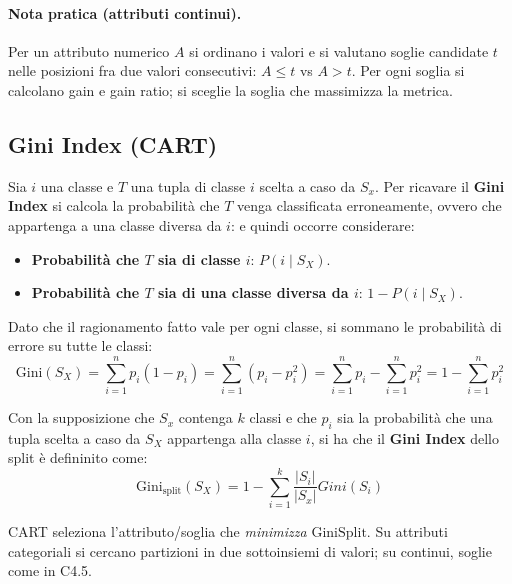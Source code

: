 \paragraph{Nota pratica (attributi continui).}
Per un attributo numerico $A$ si ordinano i valori e si valutano soglie candidate $t$ nelle posizioni fra due valori consecutivi: $A\le t$ vs $A>t$. Per ogni soglia si calcolano gain e gain ratio; si sceglie la soglia che massimizza la metrica.


\subsection{Gini Index (CART)}\label{subsec:gini}
Sia $i$ una classe e $T$ una tupla di classe $i$ scelta a caso da $S_x$. Per ricavare il \textbf{Gini Index} si calcola la probabilità che $T$ venga classificata erroneamente, ovvero che appartenga a una classe diversa da $i$: e quindi occorre considerare:
\begin{itemize}
  \item \textbf{Probabilità che $T$ sia di classe $i$}: $P(i\mid S_X)$.
  \item \textbf{Probabilità che $T$ sia di una classe diversa da $i$}: $1 - P(i\mid S_X)$.
\end{itemize}

\noindent
Dato che il ragionamento fatto vale per ogni classe, si sommano le probabilità di errore su tutte le classi:  
\[
\mathrm{Gini}(S_X) = \sum_{i=1}^n p_i (1-p_i) = \sum_{i=1}^n (p_i-p_i^2) = \sum_{i=1}^n p_i - \sum_{i=1}^n p_i^2 = 1 - \sum_{i=1}^n p_i^2 
\]

Con la supposizione che $S_x$ contenga $k$ classi e che $p_i$ sia la probabilità che una tupla scelta a caso da $S_X$ appartenga alla classe $i$, si ha che il \textbf{Gini Index} dello split è defininito come:
\[
\mathrm{Gini_{split}}(S_X) = 1 - \sum_{i=1}^k \frac{|S_i|}{|S_x|}Gini(S_i) 
\]

CART seleziona l’attributo/soglia che \emph{minimizza} $\mathrm{GiniSplit}$. Su attributi categoriali si cercano partizioni in due sottoinsiemi di valori; su continui, soglie come in C4.5.


